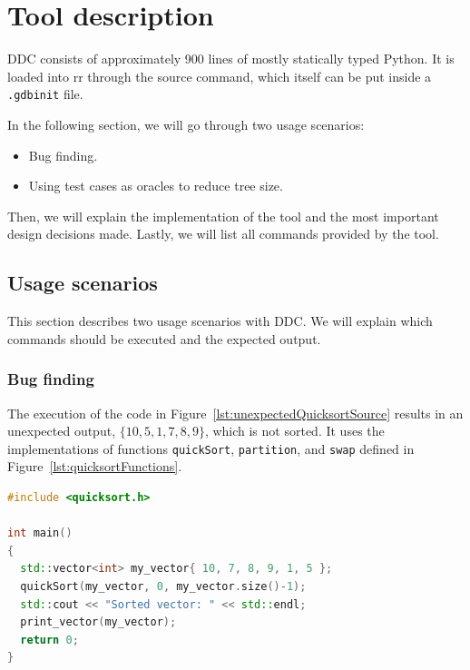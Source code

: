 \chapter{Tool description}
\label{cap:toolDescription}
DDC consists of approximately 900 lines of mostly statically typed Python.
%
It is loaded into rr through the source command, which itself can be put inside a \verb|.gdbinit| file.

In the following section, we will go through two usage scenarios:
\begin{itemize}
    \item Bug finding.
    \item Using test cases as oracles to reduce tree size.
\end{itemize}

Then, we will explain the implementation of the tool and the most important design decisions made. 
%
Lastly, we will list all commands provided by the tool.

\section{Usage scenarios}
This section describes two usage scenarios with DDC.
We will explain which commands should be executed and the expected output.

\subsection{Bug finding}
The execution of the code in Figure~\ref{lst:unexpectedQuicksortSource} results in an unexpected output, \(\{10, 5, 1, 7, 8, 9\}\), which is not sorted.
It uses the implementations of functions \verb|quickSort|, \verb|partition|, and \verb|swap| defined in Figure~\ref{lst:quicksortFunctions}.
\begin{lstlisting}[language=C++, caption={Code that results in unexpected output}, frame=tb, label={lst:unexpectedQuicksortSource}]
#include <quicksort.h>

int main()
{
  std::vector<int> my_vector{ 10, 7, 8, 9, 1, 5 };
  quickSort(my_vector, 0, my_vector.size()-1);
  std::cout << "Sorted vector: " << std::endl;
  print_vector(my_vector);
  return 0;
}
\end{lstlisting}

